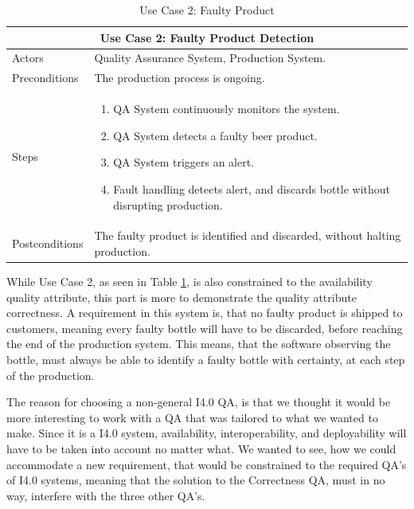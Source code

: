 \begin{table}[ht]
    \centering
    \begin{tabular}{|l|p{50mm}|}
        \hline
        \multicolumn{2}{|c|}{\textbf{Use Case 2: Faulty Product Detection}}\\
        \hline
        Actors &  Quality Assurance System, Production System.\\
        \hline
        Preconditions &  The production process is ongoing.\\
        \hline
        Steps & \begin{enumerate} 
                    \item QA System continuously monitors the system.
                    \item QA System detects a faulty beer product.
                    \item QA System triggers an alert.
                    \item Fault handling detects alert, and discards bottle without disrupting production.
                \end{enumerate}\\
        \hline
        Postconditions & The faulty product is identified and discarded, without halting production.\\
        \hline
    \end{tabular}
    \caption{Use Case 2: Faulty Product}
    \label{tab:useCase2}
\end{table}
While Use Case 2, as seen in Table \ref{tab:useCase2}, is also constrained to the availability quality attribute, this part is more to demonstrate the quality attribute correctness. A requirement in this system is, that no faulty product is shipped to customers, meaning every faulty bottle will have to be discarded, before reaching the end of the production system. This means, that the software observing the bottle, must always be able to identify a faulty bottle with certainty, at each step of the production. 

The reason for choosing a non-general I4.0 QA, is that we thought it would be more interesting to work with a QA that was tailored to what we wanted to make. Since it is a I4.0 system, availability, interoperability, and deployability will have to be taken into account no matter what. We wanted to see, how we could accommodate a new requirement, that would be constrained to the required QA's of I4.0 systems, meaning that the solution to the Correctness QA, must in no way, interfere with the three other QA's. 

